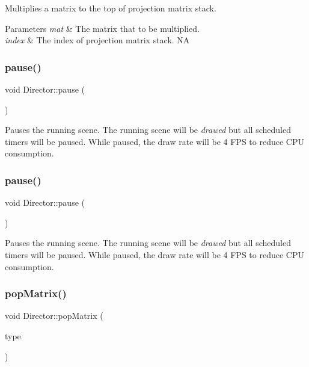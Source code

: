 Multiplies a matrix to the top of projection matrix stack.


\begin{DoxyParams}{Parameters}
{\em mat} & The matrix that to be multiplied. \\
\hline
{\em index} & The index of projection matrix stack.  NA \\
\hline
\end{DoxyParams}
\mbox{\label{classDirector_ad0e2e9b810e39c939e25ead3918faf00}} 
\subsubsection{\texorpdfstring{pause()}{pause()}\hspace{0.1cm}{\footnotesize\ttfamily [1/2]}}
{\footnotesize\ttfamily void Director\+::pause (\begin{DoxyParamCaption}\item[{void}]{ }\end{DoxyParamCaption})}

Pauses the running scene. The running scene will be {\itshape drawed} but all scheduled timers will be paused. While paused, the draw rate will be 4 F\+PS to reduce C\+PU consumption. \mbox{\label{classDirector_ad0e2e9b810e39c939e25ead3918faf00}} 
\subsubsection{\texorpdfstring{pause()}{pause()}\hspace{0.1cm}{\footnotesize\ttfamily [2/2]}}
{\footnotesize\ttfamily void Director\+::pause (\begin{DoxyParamCaption}{ }\end{DoxyParamCaption})}

Pauses the running scene. The running scene will be {\itshape drawed} but all scheduled timers will be paused. While paused, the draw rate will be 4 F\+PS to reduce C\+PU consumption. \mbox{\label{classDirector_a4c47574ac63626fa0e14eee27fed8b99}} 
\subsubsection{\texorpdfstring{pop\+Matrix()}{popMatrix()}\hspace{0.1cm}{\footnotesize\ttfamily [1/2]}}
{\footnotesize\ttfamily void Director\+::pop\+Matrix (\begin{DoxyParamCaption}\item[{\hyperlink{group__base_ga4d146cef7130a8f3a953d46964ea3905}{M\+A\+T\+R\+I\+X\+\_\+\+S\+T\+A\+C\+K\+\_\+\+T\+Y\+PE}}]{type }\end{DoxyParamCaption})}


